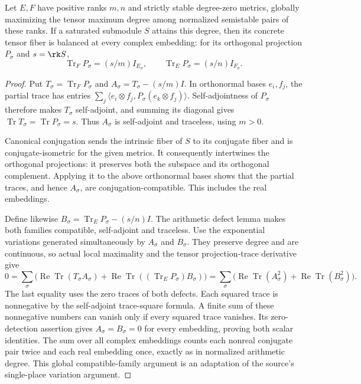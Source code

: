 \begin{lemma}
\label{lem:extremal-to-balance}
\leanok
Let $E,F$ have positive ranks $m,n$ and strictly stable degree-zero
metrics, globally maximizing the tensor maximum degree among normalized
semistable pairs of these ranks. If a saturated submodule $S$ attains
this degree, then its concrete tensor fiber is balanced at every complex
embedding: for its orthogonal projection $P_\sigma$ and $s=\rk S$,
\[
 \operatorname{Tr}_F P_\sigma=(s/m)I_{E_\sigma},\qquad
 \operatorname{Tr}_E P_\sigma=(s/n)I_{F_\sigma}.
\]
\end{lemma}
\begin{proof}
Put $T_\sigma=\operatorname{Tr}_F P_\sigma$ and
$A_\sigma=T_\sigma-(s/m)I$. In orthonormal bases $e_i,f_j$, the
partial trace has entries
$\sum_j\langle e_i\otimes f_j,P_\sigma(e_k\otimes f_j)\rangle$.
Self-adjointness of $P_\sigma$ therefore makes $T_\sigma$ self-adjoint,
and summing its diagonal gives $\operatorname{Tr}T_\sigma
=\operatorname{Tr}P_\sigma=s$. Thus $A_\sigma$ is self-adjoint
and traceless, using $m>0$.

Canonical conjugation sends the intrinsic fiber of $S$ to its conjugate
fiber and is conjugate-isometric for the given metrics. It consequently
intertwines the orthogonal projections: it preserves both the subspace
and its orthogonal complement. Applying it to the above orthonormal
bases shows that the partial traces, and hence $A_\sigma$, are
conjugation-compatible. This includes the real embeddings.

Define likewise $B_\sigma=\operatorname{Tr}_E P_\sigma-(s/n)I$.
The arithmetic defect lemma makes both families compatible, self-adjoint
and traceless. Use the exponential variations generated simultaneously
by $A_\sigma$ and $B_\sigma$. They preserve degree and are continuous,
so actual local maximality and the tensor projection-trace derivative give
\[
 0=\sum_\sigma\bigl(
 \operatorname{Re}\operatorname{Tr}(T_\sigma A_\sigma)
 +\operatorname{Re}\operatorname{Tr}
    ((\operatorname{Tr}_E P_\sigma)B_\sigma)\bigr)
 =\sum_\sigma\bigl(
 \operatorname{Re}\operatorname{Tr}(A_\sigma^2)
 +\operatorname{Re}\operatorname{Tr}(B_\sigma^2)\bigr).
\]
The last equality uses the zero traces of both defects. Each squared
trace is nonnegative by the self-adjoint trace-square formula. A finite
sum of these nonnegative numbers can vanish only if every squared trace
vanishes. Its zero-detection assertion gives $A_\sigma=B_\sigma=0$
for every embedding, proving both scalar identities.
The sum over all complex embeddings counts each nonreal conjugate pair
twice and each real embedding once, exactly as in normalized arithmetic
degree. This global compatible-family argument is an adaptation of the
source's single-place variation argument.
\end{proof}

